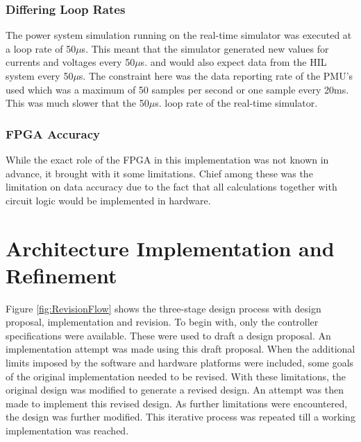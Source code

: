 \documentclass[conference]{IEEEtran}
\begin{document}
\subsubsection*{Differing Loop Rates}
The power system simulation running on the real-time simulator was executed at a loop rate of 50$\mu$s. This meant that the simulator generated new values for currents and voltages every 50$\mu$s. and would also expect data from the HIL system every 50$\mu$s. The constraint here was the data reporting rate of the PMU's used which was a maximum of 50 samples per second or one sample every 20ms. This was much slower that the 50$\mu$s. loop rate of the real-time simulator. 
\subsubsection*{FPGA Accuracy}
While the exact role of the FPGA in this implementation was not known in advance, it brought with it some limitations. Chief among these was the limitation on data accuracy due to the fact that all calculations together with circuit logic would be implemented in hardware.
\section{Architecture Implementation and Refinement}
Figure \ref{fig:RevisionFlow} shows the three-stage design process with design proposal, implementation and revision. To begin with, only the controller specifications were available. These were used to draft a design proposal. An implementation attempt was made using this draft proposal. When the additional limits imposed by the software and hardware platforms were included, some goals of the original implementation needed to be revised. With these limitations, the original design was modified to generate a revised design. An attempt was then made to implement this revised design. As further limitations were encountered, the design was further modified. This iterative process was repeated till a working implementation was reached.
\end{document}
